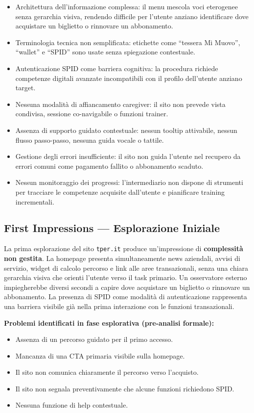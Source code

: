 \documentclass[11pt,a4paper]{article}
\begin{document}
\begin{itemize}
    \item Architettura dell'informazione complessa: il menu mescola voci eterogenee senza gerarchia visiva, rendendo difficile per l'utente anziano identificare dove acquistare un biglietto o rinnovare un abbonamento.
    \item Terminologia tecnica non semplificata: etichette come ``tessera Mi Muovo'', ``wallet'' e ``SPID'' sono usate senza spiegazione contestuale.
    \item Autenticazione SPID come barriera cognitiva: la procedura richiede competenze digitali avanzate incompatibili con il profilo dell'utente anziano target.
    \item Nessuna modalità di affiancamento caregiver: il sito non prevede vista condivisa, sessione co-navigabile o funzioni trainer.
    \item Assenza di supporto guidato contestuale: nessun tooltip attivabile, nessun flusso passo-passo, nessuna guida vocale o tattile.
    \item Gestione degli errori insufficiente: il sito non guida l'utente nel recupero da errori comuni come pagamento fallito o abbonamento scaduto.
    \item Nessun monitoraggio dei progressi: l'intermediario non dispone di strumenti per tracciare le competenze acquisite dall'utente e pianificare training incrementali.
\end{itemize}

\subsection*{First Impressions — Esplorazione Iniziale}

\noindent La prima esplorazione del sito \texttt{tper.it} produce un'impressione di \textbf{complessità non gestita}. La homepage presenta simultaneamente news aziendali, avvisi di servizio, widget di calcolo percorso e link alle aree transazionali, senza una chiara gerarchia visiva che orienti l'utente verso il task primario. Un osservatore esterno impiegherebbe diversi secondi a capire dove acquistare un biglietto o rinnovare un abbonamento. La presenza di SPID come modalità di autenticazione rappresenta una barriera visibile già nella prima interazione con le funzioni transazionali.

\noindent\textbf{Problemi identificati in fase esplorativa (pre-analisi formale):}

\begin{itemize}
    \item Assenza di un percorso guidato per il primo accesso.
    \item Mancanza di una CTA primaria visibile sulla homepage.
    \item Il sito non comunica chiaramente il percorso verso l’acquisto.
    \item Il sito non segnala preventivamente che alcune funzioni richiedono SPID.
    \item Nessuna funzione di help contestuale.
\end{itemize}
\end{document}
